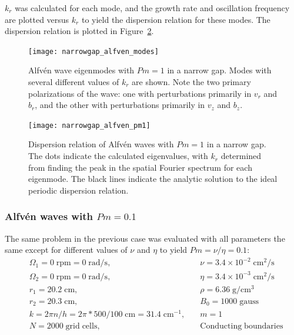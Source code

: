 \documentclass[letterpaper]{article}
\begin{document}
$k_r$ was calculated for each mode, and the growth rate and
oscillation frequency are plotted versus $k_r$ to yield the dispersion
relation for these modes.  The dispersion relation is plotted in
Figure~\ref{fig:globalcode:narrowgap_alfven_pm1}.


\begin{figure}
\centering
\texttt{[image: narrowgap\_alfven\_modes]}
\caption[Alfv\'en wave eigenmodes with $Pm=1$ in a narrow
  gap]{Alfv\'en wave eigenmodes with $Pm=1$ in a narrow gap. Modes
  with several different values of $k_r$ are shown. Note the two
  primary polarizations of the wave: one with perturbations primarily
  in $v_r$ and $b_r$, and the other with perturbations primarily in
  $v_z$ and $b_z$.}
\label{fig:globalcode:narrowgap_alfven_modes}
\end{figure}

\begin{figure}
\centering
\texttt{[image: narrowgap\_alfven\_pm1]}
\caption[Dispersion relation of Alfv\'en waves with $Pm=1$ in a narrow
  gap]{Dispersion relation of Alfv\'en waves with $Pm=1$ in a narrow
  gap. The dots indicate the calculated eigenvalues, with $k_r$
  determined from finding the peak in the spatial Fourier spectrum for
  each eigenmode. The black lines indicate the analytic solution to
  the ideal periodic dispersion relation.}
\label{fig:globalcode:narrowgap_alfven_pm1}
\end{figure}


\subsubsection{Alfv\'en waves with $Pm=0.1$}

The same problem in the previous case was evaluated with all parameters the same except for different values of $\nu$ and $\eta$ to yield $Pm = \nu/\eta = 0.1$:
\begin{align*}
&\Omega_1 = 0\;\mathrm{rpm} = 0\;\mathrm{rad/s},\quad
    &\nu = 3.4\times10^{-2}\;\mathrm{cm^2/s}
\\
&\Omega_2 = 0\;\mathrm{rpm} = 0\;\mathrm{rad/s},\quad
    &\eta = 3.4\times10^{-3}\;\mathrm{cm^2/s}
\\
&r_1 = 20.2\;\mathrm{cm},\quad &\rho = 6.36\;\mathrm{g/cm^3}
\\
&r_2 = 20.3\;\mathrm{cm},\quad &B_0 = 1000\; \mathrm{gauss}
\\
&k = 2\pi n/h = 2\pi*500/100\;\mathrm{cm} = 31.4\;\mathrm{cm^{-1}},\quad
    &m=1
\\
&N = 2000\;\mathrm{grid\;cells},\quad &\mathrm{Conducting\;boundaries}
\end{align*}
\end{document}
